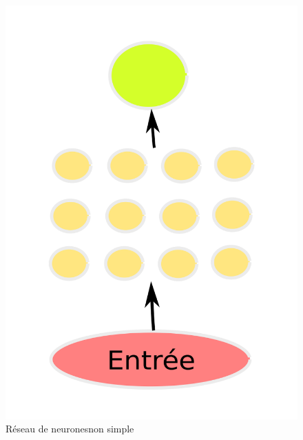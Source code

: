 \documentclass[a4paper, 11pt, onecolumn]{article}
\begin{document}
\begin{figure}[!tbp]
\begin{minipage}[b]{0.3\textwidth}
    \includegraphics[width=\textwidth]{Deep}
    \caption{Réseau de neuronesnon simple}
  \end{minipage}
  \hfill
  \begin{minipage}[b]{0.3\textwidth}

\end{minipage}
\end{figure}
\end{document}
